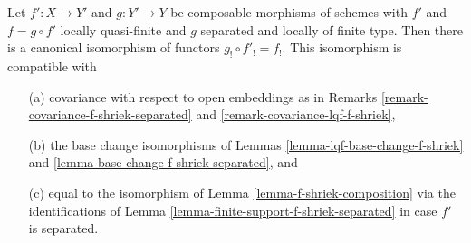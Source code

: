 \begin{lemma}
\label{lemma-lqf-separated-shriek-composition}
Let $f' : X \to Y'$ and $g : Y' \to Y$ be composable morphisms of schemes
with $f'$ and $f = g \circ f'$ locally quasi-finite and $g$ separated and
locally of finite type. Then there is a canonical isomorphism of functors
$g_! \circ f'_! = f_!$. This isomorphism is compatible with
\begin{enumerate}
\item[(a)] covariance with respect to open embeddings as in
Remarks \ref{remark-covariance-f-shriek-separated} and
\ref{remark-covariance-lqf-f-shriek},
\item[(b)] the base change isomorphisms of
Lemmas \ref{lemma-lqf-base-change-f-shriek}
and \ref{lemma-base-change-f-shriek-separated}, and
\item[(c)] equal to the isomorphism of Lemma \ref{lemma-f-shriek-composition}
via the identifications of Lemma \ref{lemma-finite-support-f-shriek-separated}
in case $f'$ is separated.
\end{enumerate}
\end{lemma}

